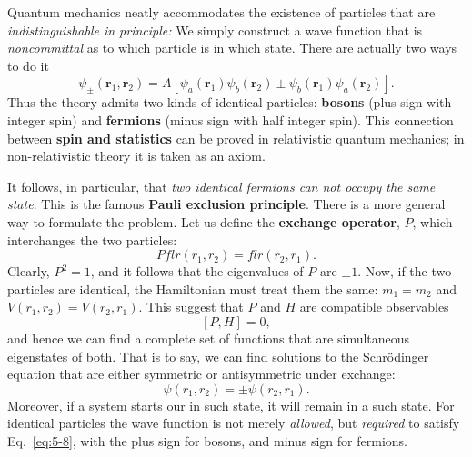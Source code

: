 Quantum mechanics neatly accommodates the existence of particles that are \textit{indistinguishable in principle:} We simply construct a wave function that is \textit{noncommittal} as to which particle is in which state.
There are actually two ways to do it
\begin{equation}
  \label{eq:5-5}
 \psi_{\pm} \left( \mathbf{r}_1, \mathbf{r}_2 \right) = A \left[ \psi_a \left( \mathbf{r}_1 \right) \psi_b \left( \mathbf{r}_2 \right) \pm \psi_b \left( \mathbf{r}_1 \right) \psi_a \left( \mathbf{r}_2 \right) \right] .
\end{equation}
Thus the theory admits two kinds of identical particles: \textbf{bosons} (plus sign with integer spin) and \textbf{fermions} (minus sign with half integer spin).
This connection between \textbf{spin and statistics} can be proved in relativistic quantum mechanics; in non-relativistic theory it is taken as an axiom.

It follows, in particular, that \textit{two identical fermions can not occupy the same state}.
This is the famous \textbf{Pauli exclusion principle}.
There is a more general way to formulate the problem.
Let us define the \textbf{exchange operator}, $P$, which interchanges the two particles:
\begin{equation}
  \label{eq:5-6}
 P f lr(r_1,r_2) = f lr(r_2,r_1) .
\end{equation}
Clearly, $P^2=1$, and it follows that the eigenvalues of $P$ are $\pm 1$.
Now, if the two particles are identical, the Hamiltonian must treat them the same: $m_1=m_2$ and $V \left( r_1,r_2 \right)=V \left( r_2,r_1 \right)$.
This suggest that $P$ and $H$ are compatible observables
\begin{equation}
  \label{eq:5-7}
  \left[ P,H \right]=0,
\end{equation}
and hence we can find a complete set of functions that are simultaneous eigenstates of both.
That is to say, we can find solutions to the Schr\"odinger equation that are either symmetric or antisymmetric under exchange:
\begin{equation}
  \label{eq:5-8}
 \psi \left( r_1, r_2 \right) = \pm \psi \left( r_2, r_1 \right) .
\end{equation}
Moreover, if a system starts our in such state, it will remain in a such state.
For identical particles the wave function is not merely \textit{allowed}, but \textit{required} to satisfy Eq.~\eqref{eq:5-8}, with the plus sign for bosons, and minus sign for fermions.


